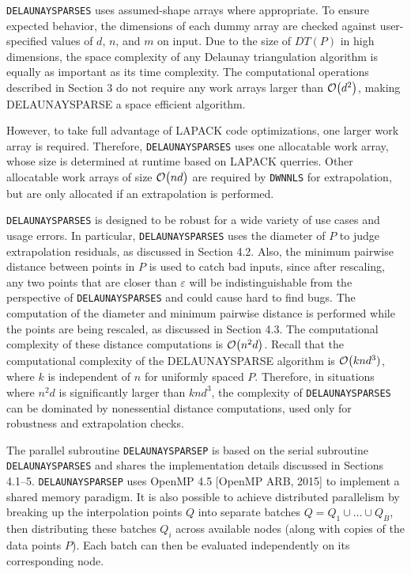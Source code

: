 {

{\tt DELAUNAYSPARSES} uses assumed-shape arrays where appropriate.
To ensure expected behavior, the dimensions of each dummy array are
checked against user-specified values of $d$, $n$, and $m$ on input.
Due to the size of $DT(P)$ in high dimensions, the space complexity of
any Delaunay triangulation algorithm is equally as important as its
time complexity. The computational operations described in Section 3
do not require any work arrays larger than ${\cal O}\big(d^2\big)$,
making DELAUNAYSPARSE a space efficient algorithm.

However, to take full advantage of LAPACK code optimizations, one
larger work array is required. Therefore, {\tt DELAUNAYSPARSES}
uses one allocatable work array, whose size is determined at runtime
based on LAPACK querries. Other allocatable work arrays of size
${\cal O}\big(nd\big)$ are required by {\tt DWNNLS} for extrapolation,
but are only allocated if an extrapolation is performed.


{\tt DELAUNAYSPARSES} is designed to be robust for a wide variety of
use cases and usage errors. In particular, {\tt DELAUNAYSPARSES} uses
the diameter of $P$ to judge extrapolation residuals, as discussed in
Section 4.2. Also, the minimum pairwise distance between points in
$P$ is used to catch bad inputs, since after rescaling, any two points
that are closer than $\varepsilon$ will be indistinguishable from
the perspective of {\tt DELAUNAYSPARSES} and could cause hard to find
bugs. The computation of the diameter and minimum pairwise distance
is performed while the points are being rescaled, as discussed in
Section 4.3. The computational complexity of these distance computations
is ${\cal O}\big(n^2d\big)$. Recall that the computational complexity of
the DELAUNAYSPARSE algorithm is ${\cal O}\big(knd^3)$, where $k$ is
independent of $n$ for uniformly spaced $P$. Therefore, in situations
where $n^2d$ is significantly larger than $knd^3$, the
complexity of {\tt DELAUNAYSPARSES} can be dominated by nonessential
distance computations, used only for robustness and extrapolation
checks.


The parallel subroutine {\tt DELAUNAYSPARSEP} is based on the serial
subroutine {\tt DELAUNAYSPARSES} and shares the implementation details
discussed in Sections 4.1--5. {\tt DELAUNAYSPARSEP} uses OpenMP 4.5 
[OpenMP ARB, 2015]
to implement a shared memory paradigm. It is also possible to achieve
distributed parallelism by breaking up the interpolation points $Q$ into
separate batches $Q = Q_1 \cup \ldots \cup Q_B$, then distributing these
batches $Q_i$ across available nodes (along with copies of the data points 
$P$). Each batch can then be evaluated independently on its corresponding
node.

}

